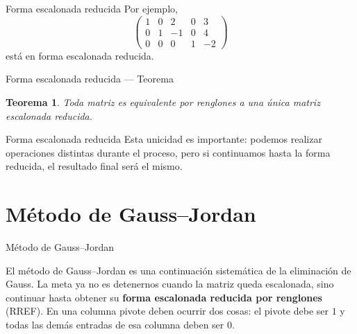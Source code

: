 \documentclass[aspectratio=169,11pt]{beamer}
\newtheorem{teorema}[definicion]{Teorema}
\theoremstyle{remark}
\begin{document}
\begin{frame}[allowframebreaks]{Forma escalonada reducida}
\footnotesize
Por ejemplo,
\[
\begin{pmatrix}
1&0&2&0&3\\
0&1&-1&0&4\\
0&0&0&1&-2
\end{pmatrix}
\]
está en forma escalonada reducida.
\end{frame}

\begin{frame}[shrink=5]{Forma escalonada reducida — Teorema}
\footnotesize
\begin{teorema}
Toda matriz es equivalente por renglones a una única matriz escalonada reducida.
\end{teorema}
\end{frame}

\begin{frame}[allowframebreaks]{Forma escalonada reducida}
\footnotesize
Esta unicidad es importante: podemos realizar operaciones distintas durante el proceso, pero si continuamos hasta la forma reducida, el resultado final será el mismo.

\end{frame}

\section{Método de Gauss--Jordan}
\begin{frame}[allowframebreaks]{Método de Gauss--Jordan}
\footnotesize

El método de Gauss--Jordan es una continuación sistemática de la eliminación de Gauss. La meta ya no es detenernos cuando la matriz queda escalonada, sino continuar hasta obtener su \textbf{forma escalonada reducida por renglones} (RREF). En una columna pivote deben ocurrir dos cosas: el pivote debe ser \(1\) y todas las demás entradas de esa columna deben ser \(0\).
\end{frame}
\end{document}
